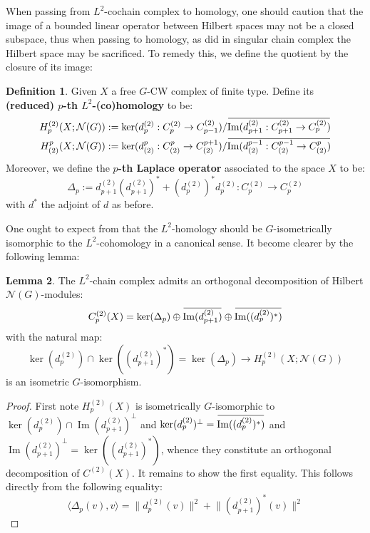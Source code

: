 \documentclass[11pt]{report}
\theoremstyle{definition}
\newtheorem{Def}{Definition}[chapter]
\newtheorem{Lemma}[Def]{Lemma}
\theoremstyle{plain}
\DeclareMathOperator{\im}{Im}
\newcommand{\vna}{\mathcal{N}}
\newcommand{\overbar}[1]{\mkern 1.5mu\overline{\mkern-1.5mu#1\mkern-1.5mu}\mkern 1.5mu}
\newcommand{\brac}[1]{\langle #1 \rangle}
\renewcommand{\bar}{\overbar}
\newcommand{\norm}[1]{\lVert #1 \rVert}
\begin{document}
When passing from $L^2$-cochain complex to homology, one should caution that the image of a bounded linear operator between Hilbert spaces may not be a closed subspace, thus when passing to homology, as did in singular chain complex the Hilbert space may be sacrificed. To remedy this, we define the quotient by the closure of its image:
\begin{Def}
	Given $X$ a free $G$-CW complex of finite type. Define its \textbf{(reduced) $p$-th $L^2$-(co)homology} to be:
	\begin{equation}
	\begin{split}
	H_p^{(2)}(X; \vna(G))&:=\ker (d_p^{(2)}:C_p^{(2)}\to C_{p-1}^{(2)})/\bar{\im(d_{p+1}^{(2)}:C_{p+1}^{(2)}\to C_{p}^{(2)})}\\
	H^p_{(2)}(X; \vna(G))&:=\ker (d^p_{(2)}:C^p_{(2)}\to C^{p+1}_{(2)})/\bar{\im(d^{p-1}_{(2)}:C^{p-1}_{(2)}\to C^{p}_{(2)})}
	\end{split}	
	\end{equation}
	Moreover, we define the \textbf{$p$-th Laplace operator} associated to the space $X$ to be:
	\begin{equation}
	\Delta_p:=d^{(2)}_{p+1}(d^{(2)}_{p+1})^*+(d^{(2)}_{p})^*d^{(2)}_{p}:C^{(2)}_p\to C^{(2)}_p
	\end{equation}
	with $d^*$ the adjoint of $d$ as before.
\end{Def}
One ought to expect from  that the $L^2$-homology should be $G$-isometrically isomorphic to the $L^2$-cohomology in a canonical sense. It become clearer by the following lemma:
\begin{Lemma}\label{1.18}
	The $L^2$-chain complex admits an orthogonal decomposition of Hilbert $\vna(G)$-modules:
	\begin{equation}
	C^{(2)}_p(X)=\ker(\Delta_p)\oplus \bar{\im(d^{(2)}_{p+1})}\oplus \bar{\im((d^{(2)}_p)^*)}
	\end{equation}
	with the natural map:
	\begin{equation}
	\ker (d_p^{(2)})\cap \ker ((d^{(2)}_{p+1})^*)=\ker(\Delta_p)\to H_p^{(2)}(X; \vna(G))
	\end{equation}
	is an isometric $G$-isomorphism.
\end{Lemma}
\begin{proof}
	First note $H_p^{(2)}(X)$ is isometrically $G$-isomorphic to $\ker(d^{(2)}_p)\cap \im(d_{p+1}^{(2)})^\perp$ and $\ker(d_p^{(2)})^\perp=\bar{\im((d_p^{(2)})^*)}$ and $\im(d_{p+1}^{(2)})^\perp=\ker((d_{p+1}^{(2)})^*)$, whence they constitute an orthogonal decomposition of $C^{(2)}(X)$. It remains to show the first equality. This follows directly from the following equality:
	\begin{equation*}
	\brac{\Delta_p(v), v}=\norm{d_p^{(2)}(v)}^2+\norm{(d_{p+1}^{(2)})^*(v)}^2
	\end{equation*}
\end{proof}
\end{document}

